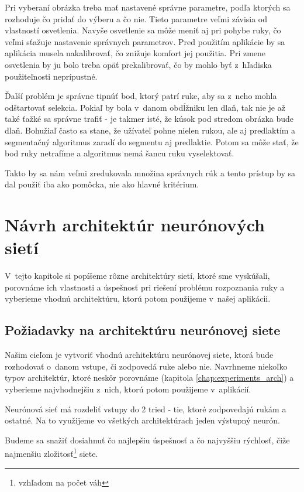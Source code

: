 Pri vyberaní obrázka treba mať nastavené správne parametre, podľa ktorých sa rozhoduje čo pridať do výberu a čo nie. Tieto parametre veľmi závisia od vlastností osvetlenia. Navyše osvetlenie sa môže meniť aj pri pohybe ruky, čo veľmi sťažuje nastavenie správnych parametrov. Pred použitím aplikácie by sa aplikácia musela nakalibrovať, čo znižuje komfort jej použitia. Pri zmene osvetlenia by ju bolo treba opäť prekalibrovať, čo by mohlo byť z~hľadiska použiteľnosti neprípustné.

Ďalší problém je správne tipnúť bod, ktorý patrí ruke, aby sa z~neho mohla odštartovať selekcia. Pokiaľ by bola v~danom obdĺžniku len dlaň, tak nie je až také ťažké sa správne trafiť - je takmer isté, že kúsok pod stredom obrázka bude dlaň. Bohužiaľ často sa stane, že užívateľ pohne nielen rukou, ale aj predlaktím a segmentačný algoritmus zaradí do segmentu aj predlaktie. Potom sa môže stať, že bod ruky netrafíme a algoritmus nemá šancu ruku vyselektovať.

Takto by sa nám veľmi zredukovala množina správnych rúk a tento prístup by sa dal použiť iba ako pomôcka, nie ako hlavné kritérium.

\section{Návrh architektúr neurónových sietí}\label{chap:neuralnetarch}

V~tejto kapitole si popíšeme rôzne architektúry sietí, ktoré sme vyskúšali, porovnáme ich vlastnosti a úspešnosť pri riešení problému rozpoznania ruky a vyberieme vhodnú architektúru, ktorú potom použijeme v~našej aplikácii.

\subsection{Požiadavky na architektúru neurónovej siete}

Našim cieľom je vytvoriť vhodnú architektúru neurónovej siete, ktorá bude rozhodovať o~danom vstupe, či zodpovedá ruke alebo nie. 
Navrhneme niekoľko typov architektúr, ktoré neskôr porovnáme (kapitola \ref{chap:experiments_arch}) a vyberieme najvhodnejšiu z~nich, ktorú potom použijeme v~aplikácií. 

Neurónová sieť má rozdeliť vstupy do 2 tried - tie, ktoré zodpovedajú rukám a ostatné. Na to využijeme vo všetkých architektúrach jeden výstupný neurón.

Budeme sa snažiť dosiahnuť čo najlepšiu úspešnosť a čo najvyššiu rýchlosť, čiže najmenšiu zložitosť\footnote{vzhľadom na počet váh} siete.

